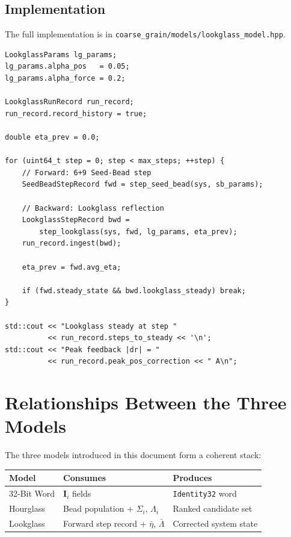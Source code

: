 \documentclass[11pt, a4paper, oneside]{article}
\theoremstyle{definition}
\newcommand{\boldI}{\bm{I}}
\newcommand{\file}[1]{\texttt{#1}}
\begin{document}
\subsection{Implementation}

The full implementation is in
\file{coarse\_grain/models/lookglass\_model.hpp}.

\begin{lstlisting}
LookglassParams lg_params;
lg_params.alpha_pos   = 0.05;
lg_params.alpha_force = 0.2;

LookglassRunRecord run_record;
run_record.record_history = true;

double eta_prev = 0.0;

for (uint64_t step = 0; step < max_steps; ++step) {
    // Forward: 6+9 Seed-Bead step
    SeedBeadStepRecord fwd = step_seed_bead(sys, sb_params);

    // Backward: Lookglass reflection
    LookglassStepRecord bwd =
        step_lookglass(sys, fwd, lg_params, eta_prev);
    run_record.ingest(bwd);

    eta_prev = fwd.avg_eta;

    if (fwd.steady_state && bwd.lookglass_steady) break;
}

std::cout << "Lookglass steady at step "
          << run_record.steps_to_steady << '\n';
std::cout << "Peak feedback |dr| = "
          << run_record.peak_pos_correction << " A\n";
\end{lstlisting}

\section{Relationships Between the Three Models}
\label{sec:relationships}

The three models introduced in this document form a coherent stack:

\begin{center}
\begin{tabular}{lll}
\toprule
Model & Consumes & Produces \\
\midrule
32-Bit Word & $\boldI_i$ fields & \texttt{Identity32} word \\
Hourglass & Bead population + $\Sigma_i$, $\Lambda_i$ & Ranked candidate set \\
Lookglass & Forward step record + $\bar\eta$, $\bar\Lambda$ & Corrected system state \\
\bottomrule
\end{tabular}
\end{center}
\end{document}
